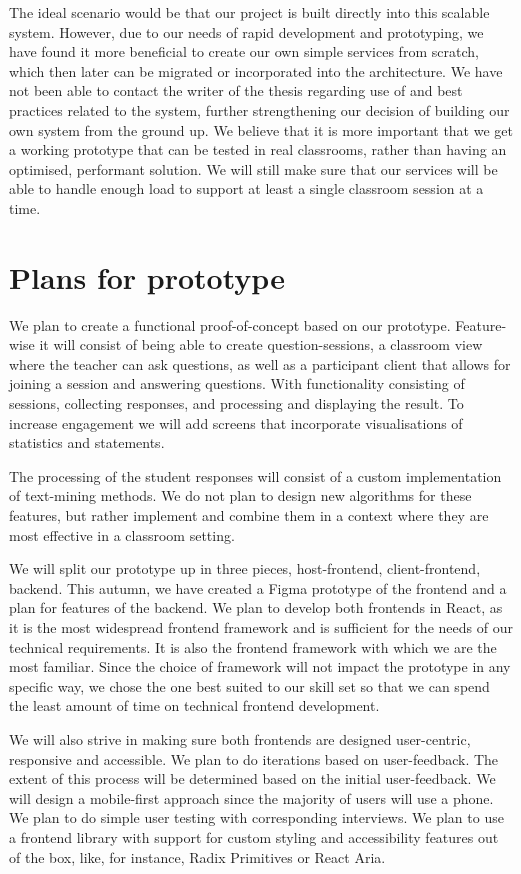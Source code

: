 The ideal scenario would be that our project is built directly into this scalable system. However, due to our needs of rapid development and prototyping, we have found it more beneficial to create our own simple services from scratch, which then later can be migrated or incorporated into the architecture. We have not been able to contact the writer of the thesis regarding use of and best practices related to the system, further strengthening our decision of building our own system from the ground up. We believe that it is more important that we get a working prototype that can be tested in real classrooms, rather than having an optimised, performant solution. We will still make sure that our services will be able to handle enough load to support at least a single classroom session at a time.

\section{Plans for prototype}
We plan to create a functional proof-of-concept based on our prototype. Feature-wise it will consist of being able to create question-sessions, a classroom view where the teacher can ask questions, as well as a participant client that allows for joining a session and answering questions. With functionality consisting of sessions, collecting responses, and processing and displaying the result. To increase engagement we will add screens that incorporate visualisations of statistics and statements.  

The processing of the student responses will consist of a custom implementation of text-mining methods. We do not plan to design new algorithms for these features, but rather implement and combine them in a context where they are most effective in a classroom setting. 

We will split our prototype up in three pieces, host-frontend, client-frontend, backend. This autumn, we have created a Figma prototype of the frontend and a plan for features of the backend. We plan to develop both frontends in React, as it is the most widespread frontend framework and is sufficient for the needs of our technical requirements. It is also the frontend framework with which we are the most familiar. Since the choice of framework will not impact the prototype in any specific way, we chose the one best suited to our skill set so that we can spend the least amount of time on technical frontend development.

We will also strive in making sure both frontends are designed user-centric, responsive and accessible. We plan to do iterations based on user-feedback. The extent of this process will be determined based on the initial user-feedback. We will design a mobile-first approach since the majority of users will use a phone. We plan to do simple user testing with corresponding interviews. We plan to use a frontend library with support for custom styling and accessibility features out of the box, like, for instance, Radix Primitives or React Aria.

